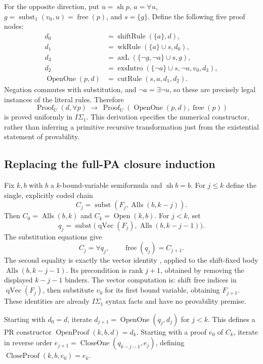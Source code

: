 For the opposite direction, put $u=\operatorname{sh}p$,
$a=\forall u$, $g=\operatorname{subst}_1(v_0,u)=\operatorname{free}(p)$,
and $s=\{g\}$.  Define the following five proof nodes:
\begin{align*}
 d_0&=\operatorname{shiftRule}(\{a\},d),\\
 d_1&=\operatorname{wkRule}(\{a\}\cup s,d_0),\\
 d_3&=\operatorname{axL}(\{\neg g,\neg a\}\cup s,g),\\
 d_2&=\operatorname{exsIntro}(\{\neg a\}\cup s,\neg u,v_0,d_3),\\
 \operatorname{OpenOne}(p,d)&=\operatorname{cutRule}(s,a,d_1,d_2).
\end{align*}
Negation commutes with substitution, and $\neg a=\exists\neg u$,
so these are precisely legal instances of the literal rules.  Therefore
\[
 \operatorname{Proof}_U(d,\forall p)
 \ \longrightarrow\ \operatorname{Proof}_U(\operatorname{OpenOne}(p,d),\operatorname{free}(p))
                                                               \tag{O1}
\]
is proved uniformly in $I\Sigma_1$.  This derivation specifies the
numerical constructor, rather than inferring a primitive recursive
transformation just from the existential statement of provability.

\subsection{Replacing the full-PA closure induction}

Fix $k,b$ with $b$ a $k$-bound-variable semiformula and
$\operatorname{sh}b=b$.  For $j\le k$ define the single, explicitly
coded chain
\[
 C_j=\operatorname{subst}(F_j,\operatorname{Alls}(b,k-j)).
\]
Then $C_0=\operatorname{Alls}(b,k)$ and $C_k=\operatorname{Open}(k,b)$.
For $j<k$, set
\[
 q_j=\operatorname{subst}\bigl(\operatorname{qVec}(F_j),
                    \operatorname{Alls}(b,k-j-1)\bigr).
\]
The substitution equations give
\[
 C_j=\forall q_j,\qquad \operatorname{free}(q_j)=C_{j+1}. \tag{Chain}
\]
The second equality is exactly the vector identity
, applied to the shift-fixed body
$\operatorname{Alls}(b,k-j-1)$.  Its precondition is rank $j+1$,
obtained by removing the displayed $k-j-1$ binders.  The vector computation
is: shift free indices in $\operatorname{qVec}(F_j)$, then substitute
$v_0$ for its first bound variable, obtaining $F_{j+1}$.
These identities are already $I\Sigma_1$ syntax facts and have no
provability premise.

Starting with $d_0=d$, iterate
$d_{j+1}=\operatorname{OpenOne}(q_j,d_j)$ for $j<k$.
This defines a PR constructor $\operatorname{OpenProof}(k,b,d)=d_k$.
Starting with a proof $e_0$ of $C_k$, iterate in reverse order
$e_{j+1}=\operatorname{CloseOne}(q_{k-j-1},e_j)$, defining
$\operatorname{CloseProof}(k,b,e_0)=e_k$.

